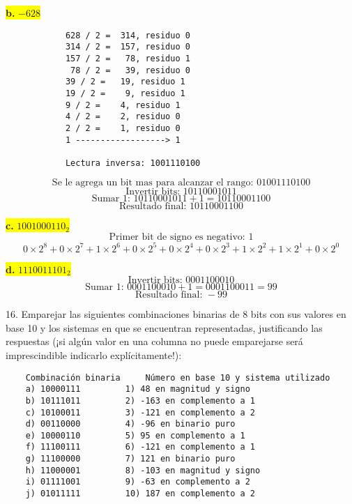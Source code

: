 \documentclass[a4paper,12pt]{article}
\begin{document}
		\begin{center}
		\colorbox{yellow}{{\textbf{b.} $-628$}} \\ \vspace{0.3cm}
		\begin{Verbatim}
			628 / 2 =  314, residuo 0
			314 / 2 =  157, residuo 0
			157 / 2 =   78, residuo 1
			 78 / 2 =   39, residuo 0
			39 / 2 =   19, residuo 1
			19 / 2 =    9, residuo 1
			9 / 2 =    4, residuo 1
			4 / 2 =    2, residuo 0
			2 / 2 =    1, residuo 0
			1 ------------------> 1
			
			Lectura inversa: 1001110100
		\end{Verbatim}
		\[
		\text{Se le agrega un bit mas para alcanzar el rango: } 01001110100
		\]
		\[
		\text{Invertir bits: } 10110001011
		\]
		\[
		\text{Sumar 1: } 10110001011 + 1 = 10110001100
		\]
		\[
		\boxed{\text{Resultado final: } 10110001100}
		\]
	\end{center}
	
	\begin{center}
		\colorbox{yellow}{{\textbf{c.} $1001000110_2$}} \\
		\[
		\text{Primer bit de signo es negativo: } 1
		\] 
		\[
		0\times2^{8} + 0\times2^{7} + 1\times2^{6} + 0\times2^{5} + 0\times2^{4} + 0\times2^{3} + 1\times2^{2} + 1\times2^{1} + 0\times2^{0}
		\]
	\end{center}
	
	\begin{center}
	\colorbox{yellow}{{\textbf{d.} $1110011101_2$}} \\
	\[
	\text{Invertir bits: } 0001100010
	\]
	\[
	\text{Sumar 1: } 0001100010 + 1 = 0001100011 = 99
	\]
	\[
	\boxed{\text{Resultado final: } -99}
	\]
	\end{center}
	
	16. Emparejar las siguientes combinaciones binarias de 8 bits con sus valores
	en base 10 y los sistemas en que se encuentran representadas, justificando
	las respuestas (¡si algún valor en una columna no puede emparejarse será
	imprescindible indicarlo explícitamente!):
	\begin{Verbatim}
	Combinación binaria		Número en base 10 y sistema utilizado
	a) 10000111			1) 48 en magnitud y signo       
	b) 10111011			2) -163 en complemento a 1    
	c) 10100011			3) -121 en complemento a 2	
	d) 00110000			4) -96 en binario puro			
	e) 10000110			5) 95 en complemento a 1		
	f) 11100111			6) -121 en complemento a 1		
	g) 11100000			7) 121 en binario puro			
	h) 11000001			8) -103 en magnitud y signo	
	i) 01111001			9) -63 en complemento a 2		
	j) 01011111			10) 187 en complemento a 2   	
	\end{Verbatim}
	
\end{document}
